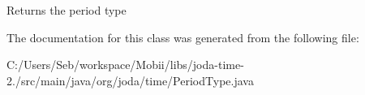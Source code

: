 \begin{DoxyReturn}{Returns}
the period type 
\end{DoxyReturn}


The documentation for this class was generated from the following file\-:\begin{DoxyCompactItemize}
\item 
C\-:/\-Users/\-Seb/workspace/\-Mobii/libs/joda-\/time-\/2./src/main/java/org/joda/time/Period\-Type.\-java\end{DoxyCompactItemize}
